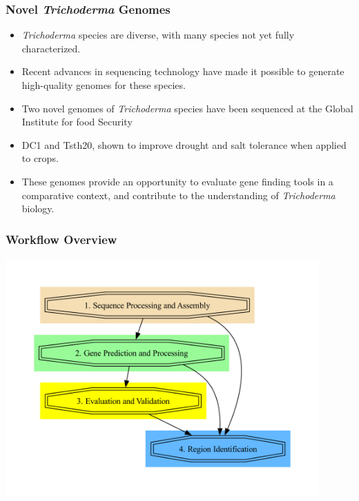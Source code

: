 \documentclass[t]{beamer}
\begin{document}
\begin{frame}
	\frametitle{Novel \textit{Trichoderma} Genomes}
	\begin{itemize}
		\item \textit{Trichoderma} species are diverse, with many species not yet fully characterized.
		\item Recent advances in sequencing technology have made it possible to generate high-quality genomes for these species.
		\item Two novel genomes of \textit{Trichoderma} species have been sequenced at the Global Institute for food Security
		\item DC1 and Tsth20, shown to improve drought and salt tolerance when applied to crops.
		\item These genomes provide an opportunity to evaluate gene finding tools in a comparative context, and contribute to the understanding of \textit{Trichoderma} biology. 
	\end{itemize}
\end{frame}

\begin{frame}
	\frametitle{Workflow Overview}
	\centering
	\includegraphics[width=0.9\textwidth]{../../working-thesis/figures/workflow-simple.pdf}
\end{frame}
\end{document}
